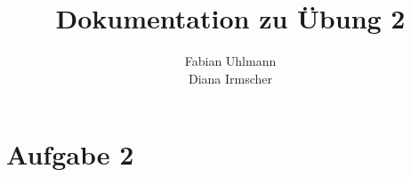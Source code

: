 \documentclass{scrartcl}
\begin{document}
\begin{titlepage}
\titlehead{Hochschule München, Fakultät 07, SoSe 2016}
\subject{Datenbanken 2}
\title{Dokumentation zu Übung 2}
\subtitle{}
\author{Fabian Uhlmann \\Diana Irmscher}
\end{titlepage}

\maketitle

\section*{Aufgabe 2}
\end{document}
